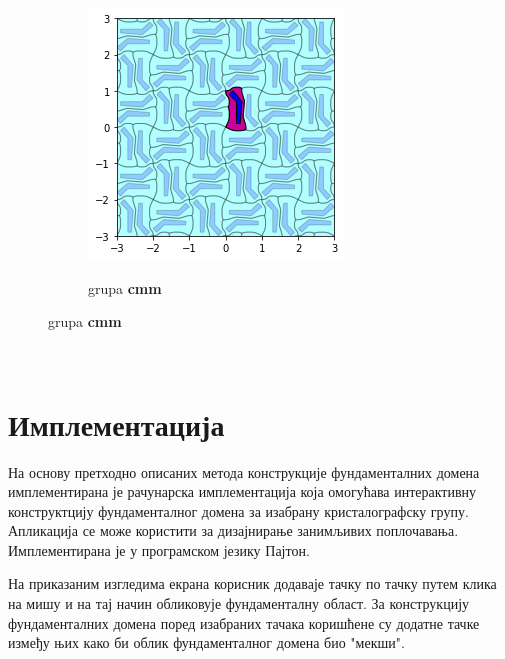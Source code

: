 \documentclass[12pt]{report}
\begin{document}
\begin{samepage}
\begin{figure}[H]
\begin{subfigure}[b]{0.3\textwidth}
  \end{subfigure}
  \begin{subfigure}[b]{0.3\textwidth}
    \includegraphics[width=\textwidth]{output_21_7.png}
    \label{fig:f25}
    \caption{grupa \textbf{cmm}}
  \end{subfigure}
\end{figure}
\end{samepage}

\quad \\ \qquad
    \chapter{Имплементација}\label{implementacija}

  На основу претходно описаних метода конструкције фундаменталних домена имплементирана је рачунарска имплементација која омогућава интерактивну конструктцију фундаменталног домена за изабрану кристалографску групу.
Апликација се може користити за дизајнирање занимљивих поплочавања.
Имплементирана је у програмском језику Пајтон.

На приказаним изгледима екрана корисник додаваје тачку по тачку путем клика на мишу и на тај начин обликовује фундаменталну област. За конструкцију фундаменталних домена поред изабраних тачака коришћене су додатне тачке између њих како би облик фундаменталног домена био "мекши". 
\end{document}
